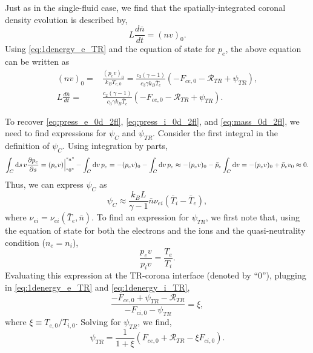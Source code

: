 \documentclass[apj]{emulateapj}
\begin{document}
	\par Just as in the single-fluid case, we find that the spatially-integrated coronal density evolution is described by,
	\begin{equation}
		L\frac{d\bar{n}}{dt} = (nv)_0.
	\end{equation}
	Using \autoref{eq:1denergy_e_TR} and the equation of state for $p_e$, the above equation can be written as
	\begin{align}
		(nv)_0 =& \frac{(p_ev)_0}{k_BT_{e,0}} = \frac{c_2(\gamma - 1)}{c_3\gamma k_B\bar{T}_e}(-F_{ce,0} - \mathcal{R}_{TR} + \psi_{TR}),\\
		L\frac{d\bar{n}}{dt} =& \frac{c_2(\gamma - 1)}{c_3\gamma k_B\bar{T}_e}(-F_{ce,0} - \mathcal{R}_{TR} + \psi_{TR}).\label{eq:0d_mass_sub}
	\end{align}
	\par To recover \autoref{eq:press_e_0d_2fl}, \autoref{eq:press_i_0d_2fl}, and \autoref{eq:mass_0d_2fl}, we need to find expressions for $\psi_C$ and $\psi_{TR}$. Consider the first integral in the definition of $\psi_C$. Using integration by parts,
	\begin{equation}
		\int_C\mathrm{d}s\,v\frac{\partial p_e}{\partial s} = (p_ev)\Big|^{``a"}_{``0"} - \int_C\mathrm{d}v\,p_e = -(p_ev)_0 - \int_C\mathrm{d}v\,p_e\approx -(p_ev)_0 -\bar{p}_e\int_C\mathrm{d}v = -(p_ev)_0 + \bar{p}_ev_0 \approx 0.
	\end{equation}
	Thus, we can express $\psi_C$ as 
	\begin{equation}
		\psi_C\approx\frac{k_BL}{\gamma -1}\bar{n}\nu_{ei}(\bar{T}_i - \bar{T}_e),
		\label{eq:psi_C}
	\end{equation}
	where $\nu_{ei}=\nu_{ei}(\bar{T}_e,\bar{n})$. To find an expression for $\psi_{TR}$, we first note that, using the equation of state for both the electrons and the ions and the quasi-neutrality condition ($n_e=n_i$), 
	\begin{equation}
		\frac{p_ev}{p_iv} = \frac{T_e}{T_i}.
	\end{equation}
	Evaluating this expression at the TR-corona interface (denoted by ``0''), plugging in \autoref{eq:1denergy_e_TR} and \autoref{eq:1denergy_i_TR},
	\begin{equation}
		\frac{- F_{ce,0} + \psi_{TR} - \mathcal{R}_{TR}}{- F_{ci,0} - \psi_{TR}} = \xi,
	\end{equation}
	where $\xi\equiv T_{e,0}/T_{i,0}$. Solving for $\psi_{TR}$, we find,
	\begin{equation}
		\psi_{TR} = \frac{1}{1+\xi}(F_{ce,0} + \mathcal{R}_{TR} - \xi F_{ci,0}).
		\label{eq:psi_TR}
	\end{equation}
\end{document}
